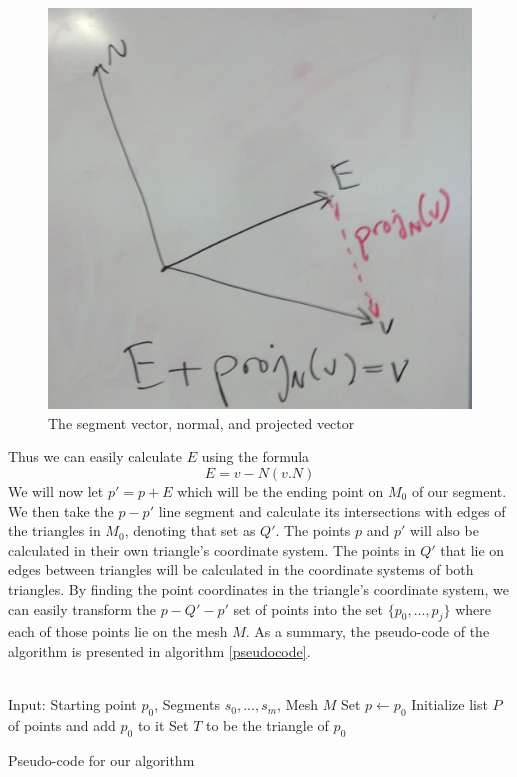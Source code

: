 \begin{figure}[ht]
\centering
\includegraphics[width=\columnwidth]{vectordiagram.jpg}
\caption{The segment vector, normal, and projected vector}
\label{vectordiagram}
\end{figure}

Thus we can easily calculate $E$ using the formula
\[
E = v - N(v.N)
\]
We will now let $p' = p+E$ which will be the ending point on $M_0$ of our segment. We then take the $p-p'$ line segment and calculate its intersections with edges of the triangles in $M_0$, denoting that set as $Q'$. The points $p$ and $p'$ will also be calculated in their own triangle's coordinate system. The points in $Q'$ that lie on edges between triangles will be calculated in the coordinate systems of both triangles. By finding the point coordinates in the triangle's coordinate system, we can easily transform the $p-Q'-p'$ set of points into the set $\{p_0,...,p_j\}$ where each of those points lie on the mesh $M$. As a summary, the pseudo-code of the algorithm is presented in algorithm \ref{pseudocode}. \\
\\
\begin{algorithm}[t]
Input: Starting point $p_0$, Segments $s_0,...,s_m$, Mesh $M$\;
Set $p \leftarrow p_0$ \;
Initialize list $P$ of points and add $p_0$ to it \;
Set $T$ to be the triangle of $p_0$ \;
\caption{Pseudo-code for our algorithm}
\label{pseudocode}
\end{algorithm}

